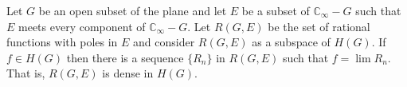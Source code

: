 Let $G$ be an open subset of the plane and let $E$ be a subset of $\mathbb{C}_{\infty} - G$ such that $E$ meets every component of $\mathbb{C}_{\infty} - G$. Let $R(G, E)$ be the set of rational functions with poles in $E$ and consider $R(G, E)$ as a subspace of $H(G)$. If $f \in H(G)$ then there is a sequence $\{R_n\}$ in $R(G, E)$ such that $f = \lim R_n$. That is, $R(G, E)$ is dense in $H(G)$.